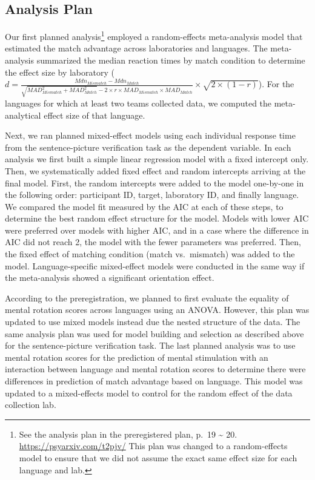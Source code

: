 \documentclass[
  man]{apa7}
\begin{document}
\hypertarget{analysis-plan}{%
\subsection{Analysis Plan}\label{analysis-plan}}

Our first planned analysis\footnote{See the analysis plan in the preregistered plan, p.~19 \textasciitilde{} 20. \url{https://psyarxiv.com/t2pjv/} This plan was changed to a random-effects model to ensure that we did not assume the exact same effect size for each language and lab.} employed a random-effects meta-analysis model that estimated the match advantage across laboratories and languages. The meta-analysis summarized the median reaction times by match condition to determine the effect size by laboratory (\(d = \frac{Mdn_{Mismatch} - Mdn_{Match}}{\sqrt{MAD_{Mismatch}^2 + MAD_{Match}^2}-2\times r\times MAD_{Mismatch} \times MAD_{Match}} \times \sqrt{2 \times (1-r)}\)). For the languages for which at least two teams collected data, we computed the meta-analytical effect size of that language.

Next, we ran planned mixed-effect models using each individual response time from the sentence-picture verification task as the dependent variable. In each analysis we first built a simple linear regression model with a fixed intercept only. Then, we systematically added fixed effect and random intercepts arriving at the final model. First, the random intercepts were added to the model one-by-one in the following order: participant ID, target, laboratory ID, and finally language. We compared the model fit measured by the AIC at each of these steps, to determine the best random effect structure for the model. Models with lower AIC were preferred over models with higher AIC, and in a case where the difference in AIC did not reach 2, the model with the fewer parameters was preferred. Then, the fixed effect of matching condition (match vs.~mismatch) was added to the model. Language-specific mixed-effect models were conducted in the same way if the meta-analysis showed a significant orientation effect.

According to the preregistration, we planned to first evaluate the equality of mental rotation scores across languages using an ANOVA. However, this plan was updated to use mixed models instead due the nested structure of the data. The same analysis plan was used for model building and selection as described above for the sentence-picture verification task. The last planned analysis was to use mental rotation scores for the prediction of mental stimulation with an interaction between language and mental rotation scores to determine there were differences in prediction of match advantage based on language. This model was updated to a mixed-effects model to control for the random effect of the data collection lab.
\end{document}
